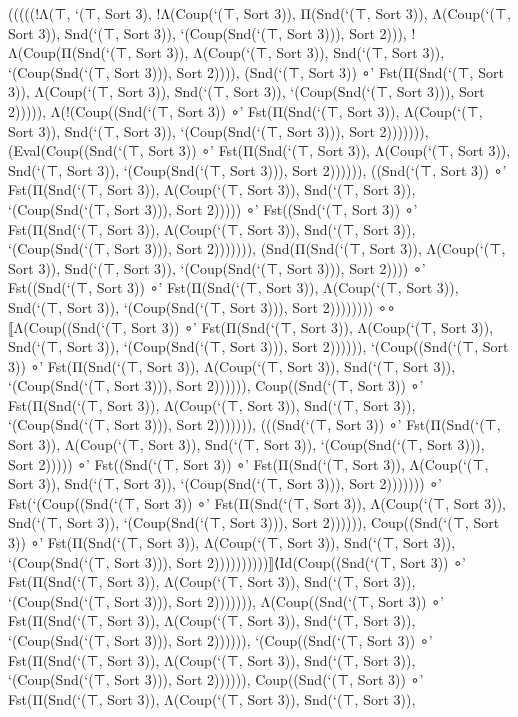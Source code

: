 \documentclass{article}
\begin{document}
\begin{leancode}
(((((!Λ(⊤, `(⊤, Sort 3), !Λ(Coup(`(⊤, Sort 3)), Π(Snd(`(⊤, Sort 3)), Λ(Coup(`(⊤, Sort 3)), Snd(`(⊤, Sort 3)), `(Coup(Snd(`(⊤, Sort 3))), Sort 2))), !Λ(Coup(Π(Snd(`(⊤, Sort 3)),
Λ(Coup(`(⊤, Sort 3)), Snd(`(⊤, Sort 3)), `(Coup(Snd(`(⊤, Sort 3))), Sort 2)))), (Snd(`(⊤, Sort 3)) ∘'
Fst(Π(Snd(`(⊤, Sort 3)), Λ(Coup(`(⊤, Sort 3)), Snd(`(⊤, Sort 3)), `(Coup(Snd(`(⊤, Sort 3))), Sort 2))))), Λ(!(Coup((Snd(`(⊤, Sort 3)) ∘' Fst(Π(Snd(`(⊤, Sort 3)), Λ(Coup(`(⊤, Sort 3)), Snd(`(⊤, Sort 3)), `(Coup(Snd(`(⊤, Sort 3))), Sort 2))))))), (Eval(Coup((Snd(`(⊤, Sort 3)) ∘' Fst(Π(Snd(`(⊤, Sort 3)),
Λ(Coup(`(⊤, Sort 3)), Snd(`(⊤, Sort 3)), `(Coup(Snd(`(⊤, Sort 3))), Sort 2)))))), ((Snd(`(⊤, Sort 3)) ∘' Fst(Π(Snd(`(⊤, Sort 3)), Λ(Coup(`(⊤, Sort 3)), Snd(`(⊤, Sort 3)), `(Coup(Snd(`(⊤, Sort 3))), Sort 2))))) ∘'
Fst((Snd(`(⊤, Sort 3)) ∘' Fst(Π(Snd(`(⊤, Sort 3)), Λ(Coup(`(⊤, Sort 3)), Snd(`(⊤, Sort 3)), `(Coup(Snd(`(⊤, Sort 3))), Sort 2))))))), (Snd(Π(Snd(`(⊤, Sort 3)), Λ(Coup(`(⊤, Sort 3)), Snd(`(⊤, Sort 3)),
`(Coup(Snd(`(⊤, Sort 3))), Sort 2)))) ∘' Fst((Snd(`(⊤, Sort 3)) ∘' Fst(Π(Snd(`(⊤, Sort 3)), Λ(Coup(`(⊤, Sort 3)), Snd(`(⊤, Sort 3)), `(Coup(Snd(`(⊤, Sort 3))), Sort 2)))))))) ∘∘ ⟦Λ(Coup((Snd(`(⊤, Sort 3)) ∘'
Fst(Π(Snd(`(⊤, Sort 3)), Λ(Coup(`(⊤, Sort 3)), Snd(`(⊤, Sort 3)), `(Coup(Snd(`(⊤, Sort 3))), Sort 2)))))), `(Coup((Snd(`(⊤, Sort 3)) ∘' Fst(Π(Snd(`(⊤, Sort 3)), Λ(Coup(`(⊤, Sort 3)), Snd(`(⊤, Sort 3)),
`(Coup(Snd(`(⊤, Sort 3))), Sort 2)))))), Coup((Snd(`(⊤, Sort 3)) ∘' Fst(Π(Snd(`(⊤, Sort 3)), Λ(Coup(`(⊤, Sort 3)), Snd(`(⊤, Sort 3)), `(Coup(Snd(`(⊤, Sort 3))), Sort 2))))))), (((Snd(`(⊤, Sort 3)) ∘'
Fst(Π(Snd(`(⊤, Sort 3)), Λ(Coup(`(⊤, Sort 3)), Snd(`(⊤, Sort 3)), `(Coup(Snd(`(⊤, Sort 3))), Sort 2))))) ∘' Fst((Snd(`(⊤, Sort 3)) ∘' Fst(Π(Snd(`(⊤, Sort 3)), Λ(Coup(`(⊤, Sort 3)), Snd(`(⊤, Sort 3)),
`(Coup(Snd(`(⊤, Sort 3))), Sort 2))))))) ∘' Fst(`(Coup((Snd(`(⊤, Sort 3)) ∘' Fst(Π(Snd(`(⊤, Sort 3)), Λ(Coup(`(⊤, Sort 3)), Snd(`(⊤, Sort 3)), `(Coup(Snd(`(⊤, Sort 3))), Sort 2)))))), Coup((Snd(`(⊤, Sort 3)) ∘'
Fst(Π(Snd(`(⊤, Sort 3)), Λ(Coup(`(⊤, Sort 3)), Snd(`(⊤, Sort 3)), `(Coup(Snd(`(⊤, Sort 3))), Sort 2))))))))))⟧⟨Id(Coup((Snd(`(⊤, Sort 3)) ∘' Fst(Π(Snd(`(⊤, Sort 3)), Λ(Coup(`(⊤, Sort 3)), Snd(`(⊤, Sort 3)),
`(Coup(Snd(`(⊤, Sort 3))), Sort 2))))))), Λ(Coup((Snd(`(⊤, Sort 3)) ∘' Fst(Π(Snd(`(⊤, Sort 3)), Λ(Coup(`(⊤, Sort 3)), Snd(`(⊤, Sort 3)), `(Coup(Snd(`(⊤, Sort 3))), Sort 2)))))), `(Coup((Snd(`(⊤, Sort 3)) ∘'
Fst(Π(Snd(`(⊤, Sort 3)), Λ(Coup(`(⊤, Sort 3)), Snd(`(⊤, Sort 3)), `(Coup(Snd(`(⊤, Sort 3))), Sort 2)))))), Coup((Snd(`(⊤, Sort 3)) ∘' Fst(Π(Snd(`(⊤, Sort 3)), Λ(Coup(`(⊤, Sort 3)), Snd(`(⊤, Sort 3)),

\end{leancode}
\end{document}
